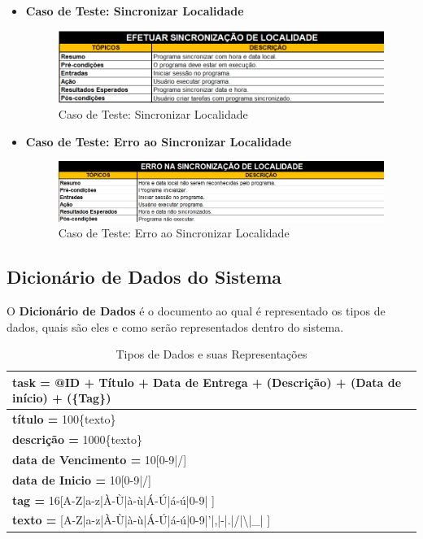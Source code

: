 \documentclass[a4paper,12pt]{article}
\begin{document}
\begin{itemize}
	\item\textbf{Caso de Teste: Sincronizar Localidade}
	\begin{figure}
		\centering
		\includegraphics[scale=0.65]{UnitTest/trueCase/syncLocale.png}
		\caption{Caso de Teste: Sincronizar Localidade}
	\end{figure}
	\item\textbf{Caso de Teste: Erro ao Sincronizar Localidade}
	\begin{figure}
		\centering
		\includegraphics[scale=0.65]{UnitTest/falseCase/syncLocale.png}
		\caption{Caso de Teste: Erro ao Sincronizar Localidade}
	\end{figure}
\end{itemize}

\subsection{Dicionário de Dados do Sistema}
O \textbf{Dicionário de Dados} é o documento ao qual é representado os tipos de dados, quais são eles e como serão 
representados dentro do sistema.
\begin{table}[H]
	\noindent
	\begin{tabular}{|l|}
		\hline
			\textbf{task =} @ID + Título + Data de Entrega + (Descrição) + (Data de início) + (\{Tag\})\\ \hline
			\textbf{título =} 100\{texto\} \\ \hline
			\textbf{descrição =} 1000\{texto\} \\ \hline
			\textbf{data de Vencimento =} 10[0-9|/] \\ \hline
			\textbf{data de Inicio =} 10[0-9|/] \\ \hline
			\textbf{tag =} 16[A-Z|a-z|À-Ù|à-ù|Á-Ú|á-ú|0-9| ] \\ \hline
			\textbf{texto =} [A-Z|a-z|À-Ù|à-ù|Á-Ú|á-ú|0-9|'|,|-|.|/|\textbackslash|\_| ] \\ \hline
	\end{tabular}
	\caption{Tipos de Dados e suas Representações}
\end{table}
\end{document}
